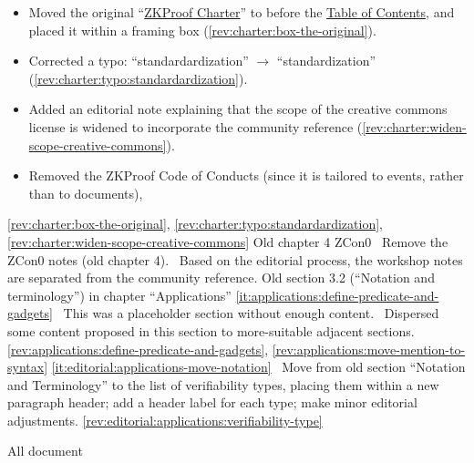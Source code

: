 				\begin{itemize}
				\item Moved the original ``\hyperref[sec:prelim:charter]{ZKProof Charter}'' to before the \hyperref[prelim:contents]{Table of Contents}, and placed it within a framing box (\ref{rev:charter:box-the-original}).
				\item Corrected a typo: ``standardardization'' $\rightarrow$ ``standardization'' (\ref{rev:charter:typo:standardardization}).
				\item Added an editorial note explaining that the scope of the creative commons license is widened to incorporate the community reference (\ref{rev:charter:widen-scope-creative-commons}).
				\item Removed the ZKProof Code of Conducts (since it is tailored to events, rather than to documents), 
				\end{itemize}
\newcol \ref{rev:charter:box-the-original}, \ref{rev:charter:typo:standardardization}, \ref{rev:charter:widen-scope-creative-commons}
\rowendL
Old chapter 4 ZCon0
\newcol 
\newcol {}
\newcol \Chan\ Remove the ZCon0 notes (old chapter 4). \Note\ Based on the editorial process, 
				the workshop notes are separated from the community reference.
\newcol 
\rowendL
Old section 3.2 (``Notation and terminology'') in chapter ``Applications''
\newcol 
\newcol \ref{it:applications:define-predicate-and-gadgets}
\newcol \Note\ This was a placeholder section without enough content.
				\Chan\ Dispersed some content proposed in this section to more-suitable adjacent sections.
\newcol \ref{rev:applications:define-predicate-and-gadgets}, \ref{rev:applications:move-mention-to-syntax}
\rowendL
\newcol 
\newcol \ref{it:editorial:applications-move-notation}
\newcol \Chan\ Move from old section ``Notation and Terminology'' to  
the list of verifiability types, placing them within a new paragraph header; 
add a header label for each type; make minor editorial adjustments.
\newcol \ref{rev:editorial:applications:verifiability-type}
\rowendL

All document
\newcol 
\newcol {}
\newcol \Chan\ 
\newcol 
\rowendL
\myendIssue
